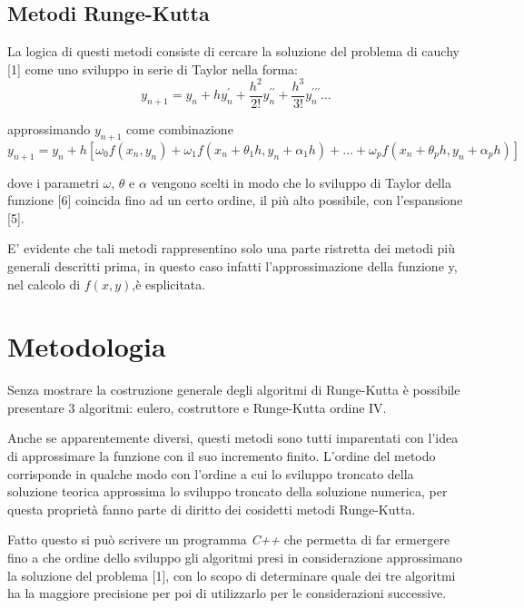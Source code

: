 \documentclass[11pt]{article}
\begin{document}
\subsection{Metodi Runge-Kutta}
La logica di questi metodi consiste di cercare la soluzione del problema di cauchy [1] come uno sviluppo in serie di Taylor nella forma:
	\begin{equation}
		y_{n+1}=y_{n} + hy_{n}^{\prime} + \frac{h^{2}}{2!}y_{n}^{\prime \prime} +  \frac{h^{3}}{3!}y_{n}^{\prime \prime \prime} \ldots 
	\end{equation}

approssimando $y_{n+1}$ come combinazione
	\begin{equation}
		y_{n+1}=y_{n} + h[\omega_{0}f(x_{n},y_{n}) + \omega_{1}f(x_{n}+\theta_{1}h,y_{n}+\alpha_{1}h ) + \ldots + \omega_{p}f(x_{n}+\theta_{p}h,y_{n}+\alpha_{p}h )] 
	\end{equation}

dove i parametri $\omega$, $\theta$ e $\alpha$ vengono scelti in modo che lo sviluppo di Taylor della funzione [6] coincida fino ad un certo ordine, il più alto possibile, con l'espansione [5].

E' evidente che tali metodi rappresentino solo una parte ristretta dei metodi più generali descritti prima, in questo caso infatti l'approssimazione della funzione y, nel calcolo di $f(x,y)$,è esplicitata.



\section{Metodologia}

Senza mostrare la costruzione generale degli algoritmi di Runge-Kutta è possibile presentare 3 algoritmi: eulero, costruttore e Runge-Kutta ordine IV.

Anche se apparentemente diversi, questi metodi sono tutti imparentati con l'idea di approssimare la funzione con il suo incremento finito.
L'ordine del metodo corrisponde in qualche modo con l'ordine a cui lo sviluppo troncato della soluzione teorica approssima lo sviluppo troncato della soluzione numerica, per questa proprietà fanno parte di diritto dei cosidetti metodi Runge-Kutta.

Fatto questo si può scrivere un programma \emph{C++} che permetta di far ermergere fino a che ordine dello sviluppo gli algoritmi presi in considerazione approssimano la soluzione del problema [1], con lo scopo di determinare quale dei tre algoritmi ha la maggiore precisione per poi di utilizzarlo per le considerazioni successive.
\end{document}
